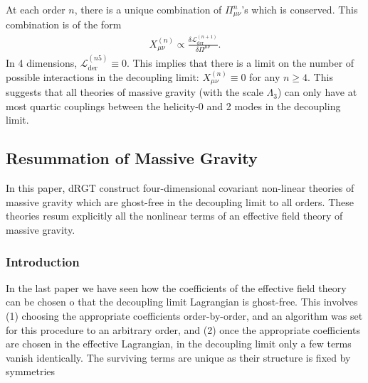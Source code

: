 \documentclass{book}
\theoremstyle{definition}
\newcommand{\lag}{\mathcal{L}}
\newcommand{\f}[2]{\frac{#1}{#2}}
\begin{document}
At each order $n$, there is a unique combination of $\Pi^n_{\mu\nu}$'s which is conserved. This combination is of the form 
\begin{align}
X_{\mu\nu}^{(n)} \propto \f{\delta \lag_\text{der}^{(n+1)}}{\delta \Pi^{\mu\nu}}.
\end{align}
In 4 dimensions, $\lag_\text{der}^{(n5)} \equiv 0$. This implies that there is a limit on the number of possible interactions in the decoupling limit: $X_{\mu\nu}^{(n)} \equiv 0$ for any $n \geq 4$. This suggests
that all theories of massive gravity (with the scale $\Lambda_3$) can only have at most quartic
couplings between the helicity-0 and 2 modes in the decoupling limit.

























\newpage
\subsection{Resummation of Massive Gravity}
In this paper, dRGT construct four-dimensional covariant non-linear theories of massive gravity which are ghost-free in the decoupling limit to all orders. These theories resum explicitly all the nonlinear terms of an effective field theory of massive gravity.


\subsubsection{Introduction}

In the last paper we have seen how the coefficients of the effective field theory can be chosen o that the decoupling limit Lagrangian is ghost-free. This involves (1) choosing the appropriate coefficients order-by-order, and an algorithm was set for this procedure to an arbitrary order, and (2) once the appropriate coefficients are chosen in the effective Lagrangian, in the decoupling limit only a few terms vanish identically. The surviving terms are unique as their structure is fixed by symmetries \\
\end{document}
